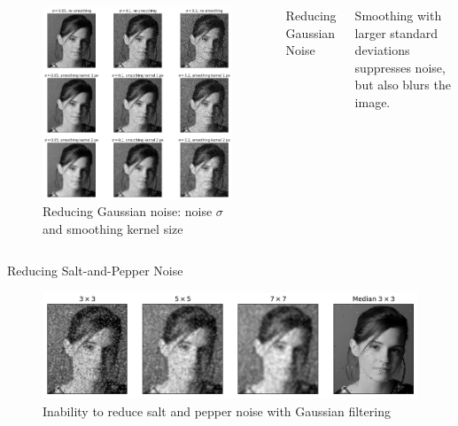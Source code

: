 \begin{frame}[plain]
    \begin{columns}[t]
        \begin{figure}
          \centering
          \includegraphics[width=\textwidth]{./figures/noise_level_and_smoothing.jpg}
          \caption{Reducing Gaussian noise: noise $\sigma$ and smoothing kernel size}
        \end{figure}
            \vspace{0.5in}
            Reducing Gaussian Noise\par
            Smoothing with larger standard deviations suppresses noise, but also blurs the image.
    \end{columns}
\end{frame}



\begin{frame}{Reducing Salt-and-Pepper Noise}
    \begin{figure}
      \centering
      \includegraphics[width=\textwidth]{./figures/s_and_p_with_gaussian.jpg}
      \caption{Inability to reduce salt and pepper noise with Gaussian filtering}
    \end{figure}
\end{frame}


